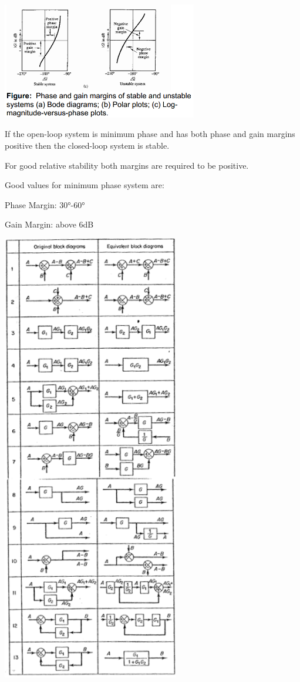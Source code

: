 \documentclass[a0,landscape]{article}
\begin{document}
\begin{multicols}{3}
\includegraphics[width=3.35139in,height=1.99763in]{media/image27.png}

If the open-loop system is minimum phase and has both phase and gain
margins positive then the closed-loop system is stable.

For good relative stability both margins are required to be positive.

Good values for minimum phase system are:

Phase Margin: 30°-60°

Gain Margin: above 6dB

\includegraphics[width=3.03806in,height=7.77358in]{media/image28.png}

\end{multicols}
\end{document}
